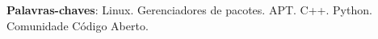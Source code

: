 \begin{resumo}

    


 \vspace{\onelineskip}
    
 \noindent
 \textbf{Palavras-chaves}: Linux. Gerenciadores de pacotes. APT. C++. Python. Comunidade Código Aberto.
\end{resumo}
